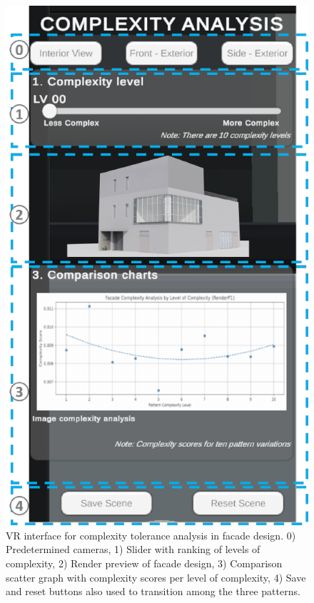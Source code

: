      \begin{figure}[!htb]
          \centering
          \includegraphics[width= \linewidth]{Images/VRInterface}
          \caption{VR interface for complexity tolerance analysis in facade design. 0) Predetermined cameras, 1) Slider with ranking of levels of complexity, 2) Render preview of facade design, 3) Comparison scatter graph with complexity scores per level of complexity, 4) Save and reset buttons also used to transition among the three patterns.}
          \label{fig:VRInterface}
        \end{figure}

